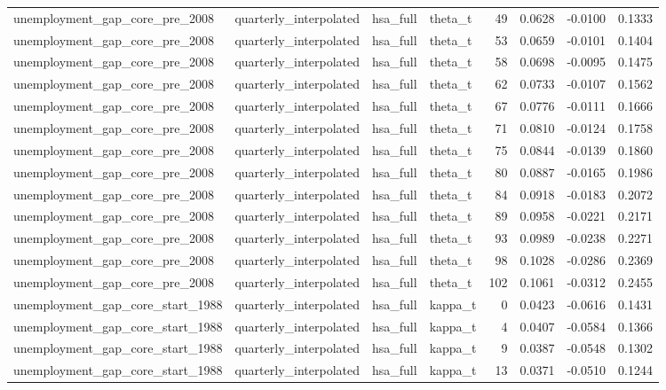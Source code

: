 \begin{tabular}{llllrrrr}
unemployment\_gap\_core\_pre\_2008 & quarterly\_interpolated & hsa\_full & theta\_t & 49 & 0.0628 & -0.0100 & 0.1333 \\
unemployment\_gap\_core\_pre\_2008 & quarterly\_interpolated & hsa\_full & theta\_t & 53 & 0.0659 & -0.0101 & 0.1404 \\
unemployment\_gap\_core\_pre\_2008 & quarterly\_interpolated & hsa\_full & theta\_t & 58 & 0.0698 & -0.0095 & 0.1475 \\
unemployment\_gap\_core\_pre\_2008 & quarterly\_interpolated & hsa\_full & theta\_t & 62 & 0.0733 & -0.0107 & 0.1562 \\
unemployment\_gap\_core\_pre\_2008 & quarterly\_interpolated & hsa\_full & theta\_t & 67 & 0.0776 & -0.0111 & 0.1666 \\
unemployment\_gap\_core\_pre\_2008 & quarterly\_interpolated & hsa\_full & theta\_t & 71 & 0.0810 & -0.0124 & 0.1758 \\
unemployment\_gap\_core\_pre\_2008 & quarterly\_interpolated & hsa\_full & theta\_t & 75 & 0.0844 & -0.0139 & 0.1860 \\
unemployment\_gap\_core\_pre\_2008 & quarterly\_interpolated & hsa\_full & theta\_t & 80 & 0.0887 & -0.0165 & 0.1986 \\
unemployment\_gap\_core\_pre\_2008 & quarterly\_interpolated & hsa\_full & theta\_t & 84 & 0.0918 & -0.0183 & 0.2072 \\
unemployment\_gap\_core\_pre\_2008 & quarterly\_interpolated & hsa\_full & theta\_t & 89 & 0.0958 & -0.0221 & 0.2171 \\
unemployment\_gap\_core\_pre\_2008 & quarterly\_interpolated & hsa\_full & theta\_t & 93 & 0.0989 & -0.0238 & 0.2271 \\
unemployment\_gap\_core\_pre\_2008 & quarterly\_interpolated & hsa\_full & theta\_t & 98 & 0.1028 & -0.0286 & 0.2369 \\
unemployment\_gap\_core\_pre\_2008 & quarterly\_interpolated & hsa\_full & theta\_t & 102 & 0.1061 & -0.0312 & 0.2455 \\
unemployment\_gap\_core\_start\_1988 & quarterly\_interpolated & hsa\_full & kappa\_t & 0 & 0.0423 & -0.0616 & 0.1431 \\
unemployment\_gap\_core\_start\_1988 & quarterly\_interpolated & hsa\_full & kappa\_t & 4 & 0.0407 & -0.0584 & 0.1366 \\
unemployment\_gap\_core\_start\_1988 & quarterly\_interpolated & hsa\_full & kappa\_t & 9 & 0.0387 & -0.0548 & 0.1302 \\
unemployment\_gap\_core\_start\_1988 & quarterly\_interpolated & hsa\_full & kappa\_t & 13 & 0.0371 & -0.0510 & 0.1244 \\

\end{tabular}
